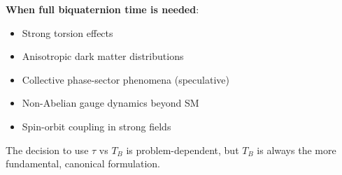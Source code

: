 \textbf{When full biquaternion time is needed}:
\begin{itemize}
    \item Strong torsion effects
    \item Anisotropic dark matter distributions
    \item Collective phase-sector phenomena (speculative)
    \item Non-Abelian gauge dynamics beyond SM
    \item Spin-orbit coupling in strong fields
\end{itemize}

The decision to use $\tau$ vs $T_B$ is problem-dependent, but $T_B$ is always the more fundamental, canonical formulation.

